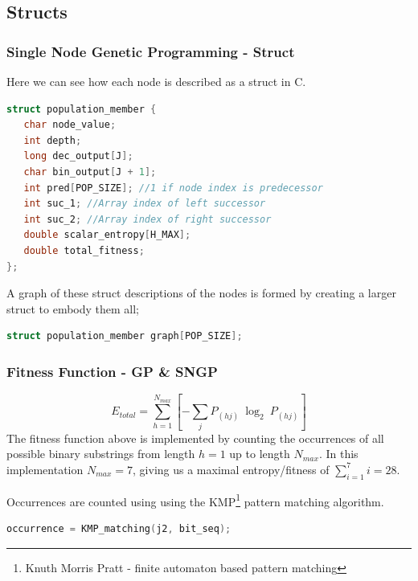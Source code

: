 \documentclass{beamer}
\begin{document}
\subsection{Structs}
\begin{frame}[fragile]
\frametitle{Single Node Genetic Programming - Struct}
Here we can see how each node is described as a struct in C.\newline

\begin{lstlisting}[language=C]
struct population_member {
   char node_value;
   int depth;
   long dec_output[J];
   char bin_output[J + 1];
   int pred[POP_SIZE]; //1 if node index is predecessor
   int suc_1; //Array index of left successor
   int suc_2; //Array index of right successor 
   double scalar_entropy[H_MAX];
   double total_fitness;
};
\end{lstlisting}
A graph of these struct descriptions of the nodes is formed by creating a larger struct to embody them all;\newline

\begin{lstlisting}[language=C]
struct population_member graph[POP_SIZE];
\end{lstlisting}

\end{frame}

\begin{frame}[fragile]
\frametitle{Fitness Function - GP \& SNGP}

\begin{equation*}
E_{total} = \sum_{h = 1}^{N_{max}} \left[ - \sum_{j} P_{(hj)}\ \log_2\ P_{(hj)} \right]
\end{equation*}
\newline
The fitness function above is implemented by counting the occurrences of all possible binary substrings from length $h = 1$ up to length $N_{max}$. In this implementation $N_{max} = 7$, giving us a maximal entropy/fitness of $\sum_{i=1}^{7} i = 28$.\newline

Occurrences are counted using using the KMP\footnote{Knuth Morris Pratt - finite automaton based pattern matching}  pattern matching algorithm.
\newline
\begin{lstlisting}[language=C]
occurrence = KMP_matching(j2, bit_seq);
\end{lstlisting}

\end{frame}
\end{document}
